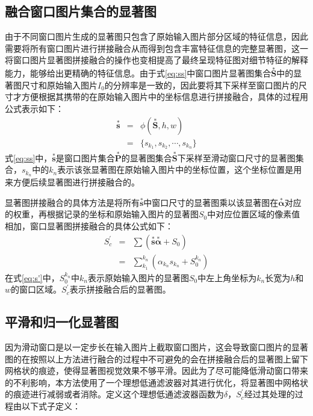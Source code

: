 \subsection{融合窗口图片集合的显著图}
由于不同窗口图片生成的显著图只包含了原始输入图片部分区域的特征信息，因此需要将所有窗口图片进行拼接融合从而得到包含丰富特征信息的完整显著图，这一将窗口图片显著图拼接融合的操作也变相提高了最终呈现特征图对细节特征的解释能力，能够给出更精确的特征信息。由于式\ref{eq:ss}中窗口图片显著图集合$\overset{*}{\bm{S}}$中的显著图尺寸和原始输入图片$I_0$的分辨率是一致的，因此要将其下采样至窗口图片的尺寸才方便根据其携带的在原始输入图片中的坐标信息进行拼接融合，具体的过程用公式表示如下：
\begin{eqnarray}
	\overset{*}{\bm{s}} &=& \phi(\overset{*}{\bm{S}},h,w) \nonumber \\
	~ &=& \{s_{k_1},s_{k_2},\cdots,s_{k_n}\}
\label{eq:ss}
\end{eqnarray}
式\ref{eq:ss}中，$\overset{*}{\bm{s}}$是窗口图片集合$\overset{*}{\bm{P}}$的显著图集合$\overset{*}{\bm{S}}$下采样至滑动窗口尺寸的显著图集合，$s_{k_n}$中的$k_n$表示该张显著图在原始输入图片中的坐标位置，这个坐标位置是用来方便后续显著图进行拼接融合的。

显著图拼接融合的具体方法是将所有$\overset{*}{\bm{s}}$中窗口尺寸的显著图乘以该显著图在$\overset{*}{\bm{\alpha}}$对应的权重，再根据记录的坐标和原始输入图片的显著图$S_0$中对应位置区域的像素值相加，窗口显著图拼接融合的具体公式如下：
\begin{eqnarray}
	S^{\prime}_c &=& \sum(\overset{*}{\bm{s}}\overset{*}{\bm{\alpha}}+S_0) \nonumber \\
	~ &=& \sum_{k_1}^{k_n}(\alpha_{k_n}s_{k_n}+S_0^{k_n})
	\label{eq:s'}
\end{eqnarray}
在式\ref{eq:s'}中，$S_0^{k_n}$中$k_n$表示原始输入图片的显著图$S_0$中左上角坐标为$k_n$长宽为$h$和$w$的窗口区域。$S^{\prime}_c$表示拼接融合后的显著图。

\subsection{平滑和归一化显著图}
因为滑动窗口是以一定步长在输入图片上截取窗口图片，这会导致窗口图片的显著图的在按照以上方法进行融合的过程中不可避免的会在拼接融合后的显著图上留下网格状的痕迹，使得显著图视觉效果不够平滑。因此为了尽可能降低滑动窗口带来的不利影响，本方法使用了一个理想低通滤波器对其进行优化，将显著图中网格状的痕迹进行减弱或者消除。定义这个理想低通滤波器函数为$\delta$，$S^{\prime}_c$经过其处理的过程由以下式子定义：

